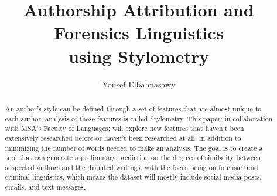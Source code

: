 \documentclass[journal]{IEEEtran}
\begin{document}
\title{Authorship Attribution and Forensics Linguistics\\ using Stylometry}

\author{Yousef Elbahnasawy}


\maketitle

\begin{abstract}
    An author's style can be defined through a set of features that are almost unique to each author,
    analysis of these features is called Stylometry. This paper; in collaboration with MSA's Faculty of Languages;
    will explore new features that haven't been extensively researched before or haven't been researched at all, in addition to minimizing the number of words needed to make an analysis.
    The goal is to create a tool that can generate a preliminary prediction on the degrees of similarity between suspected authors and the disputed writings,
    with the focus being on forensics and criminal linguistics, which means the dataset will mostly include social-media posts, emails, and text messages.
\end{abstract}










\end{document}
